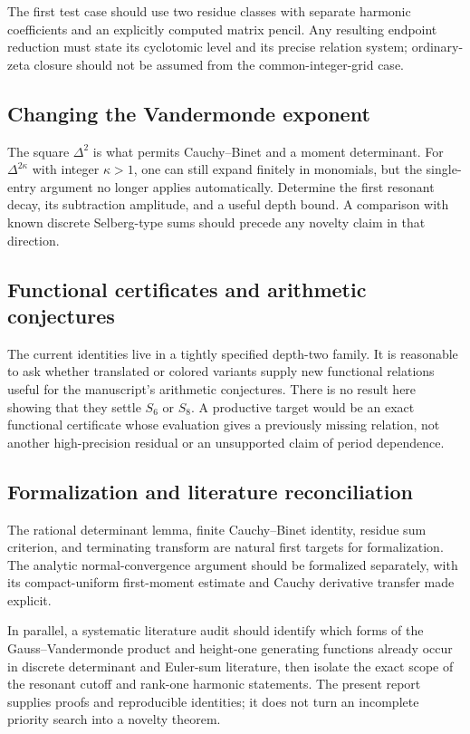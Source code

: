 \documentclass[11pt,letterpaper]{article}
\numberwithin{equation}{section}
\theoremstyle{definition}\newtheorem{definition}[theorem]{Definition}
\theoremstyle{remark}\newtheorem{remark}[theorem]{Remark}
\begin{document}
The first test case should use two residue classes with separate
harmonic coefficients and an explicitly computed matrix pencil.
Any resulting endpoint reduction must state its cyclotomic level and
its precise relation system; ordinary-zeta closure should not be
assumed from the common-integer-grid case.

\subsection{Changing the Vandermonde exponent}
The square $\Delta^2$ is what permits Cauchy--Binet and a moment
determinant. For $\Delta^{2\kappa}$ with integer $\kappa>1$, one
can still expand finitely in monomials, but the single-entry argument
no longer applies automatically. Determine the first resonant decay,
its subtraction amplitude, and a useful depth bound. A comparison
with known discrete Selberg-type sums should precede any novelty
claim in that direction.

\subsection{Functional certificates and arithmetic conjectures}
The current identities live in a tightly specified depth-two family.
It is reasonable to ask whether translated or colored variants supply
new functional relations useful for the manuscript's arithmetic
conjectures. There is no result here showing that they settle $S_6$
or $S_8$. A productive target would be an exact functional certificate
whose evaluation gives a previously missing relation, not another
high-precision residual or an unsupported claim of period dependence.

\subsection{Formalization and literature reconciliation}
The rational determinant lemma, finite Cauchy--Binet identity, residue
sum criterion, and terminating transform are natural first targets
for formalization. The analytic normal-convergence argument should
be formalized separately, with its compact-uniform first-moment
estimate and Cauchy derivative transfer made explicit.

In parallel, a systematic literature audit should identify which
forms of the Gauss--Vandermonde product and height-one generating
functions already occur in discrete determinant and Euler-sum
literature, then isolate the exact scope of the resonant cutoff and
rank-one harmonic statements. The present report supplies proofs and
reproducible identities; it does not turn an incomplete priority
search into a novelty theorem.
\end{document}

